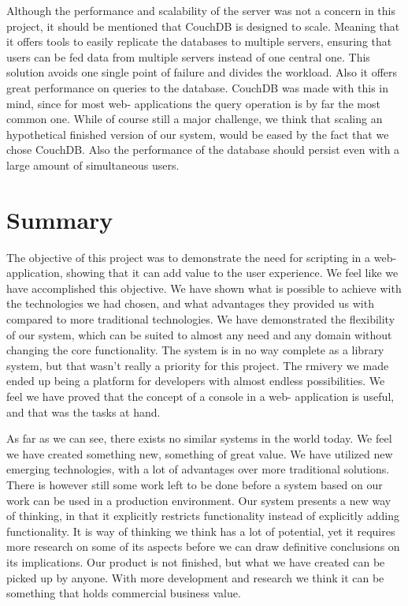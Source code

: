 Although the performance and scalability of the server was not a concern in this project, it should be mentioned that CouchDB is designed to scale. Meaning that it offers tools to easily replicate the databases to multiple servers, ensuring that users can be fed data from multiple servers instead of one central one. This solution avoids one single point of failure and divides the workload. Also it offers great performance on queries to the database. CouchDB was made with this in mind, since for most web- applications the query operation is by far the most common one. While of course still a major challenge, we think that scaling an hypothetical finished version of our system, would be eased by the fact that we chose CouchDB. Also the performance of the database should persist even with a large amount of simultaneous users.


\section{Summary}
The objective of this project was to demonstrate the need for scripting in a web- application, showing that it can add value to the user experience. We feel like we have accomplished this objective. We have shown what is possible to achieve with the technologies we had chosen, and what advantages they provided us with compared to more traditional technologies. We have demonstrated the flexibility of our system, which can be suited to almost any need and any domain without changing the core functionality. The system is in no way complete as a library system, but that wasn’t really a priority for this project. The rmivery we made ended up being a platform for developers with almost endless possibilities. We feel we have proved that the concept of a console in a web- application is useful, and that was the tasks at hand.

As far as we can see, there exists no similar systems in the world today. We feel we have created something new, something of great value. We have utilized new emerging technologies, with a lot of advantages over more traditional solutions. There is however still some work left to be done before a system based on our work can be used in a production environment. Our system presents a new way of thinking, in that it explicitly restricts functionality instead of explicitly adding functionality. It is way of thinking we think has a lot of potential, yet it requires more research on some of its aspects before we can draw definitive conclusions on its implications. Our product is not finished, but what we have created can be picked up by anyone. With more development and research we think it can be something that holds commercial business value.



